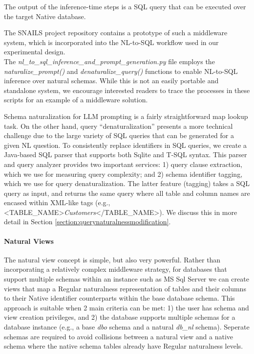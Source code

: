 The output of the inference-time steps is a SQL query that can be executed over the target Native database.

The SNAILS project repository contains a prototype of such a middleware system, which is incorporated into the NL-to-SQL workflow used in our experimental design.
\\The \emph{nl\_to\_sql\_inference\_and\_prompt\_generation.py} file employs the \emph{naturalize\_prompt()} and \emph{denaturalize\_query()} functions to enable NL-to-SQL inference over natural schemas.
While this is not an easily portable and standalone system, we encourage interested readers to trace the processes in these scripts for an example of a middleware solution.

Schema naturalization for LLM prompting is a fairly straightforward map lookup task. 
On the other hand, query ``denaturalization'' presents a more technical challenge due to the large variety of SQL queries that can be generated for a given NL question.
To consistently replace identifiers in SQL queries, we create a Java-based SQL parser that supports both Sqlite and T-SQL syntax.
This parser and query analyzer provides two important services: 1) query clause extraction, which we use for measuring query complexity; and 2) schema identifier tagging, which we use for query denaturalization.
The latter feature (tagging) takes a SQL query as input, and returns the same query where all table and column names are encased within XML-like tags (e.g., <TABLE\_NAME>\emph{Customers}</TABLE\_NAME>).
We discuss this in more detail in Section \ref{section:querynaturalnessmodification}.

\paragraph{\textbf{Natural Views}}

The natural view concept is simple, but also very powerful.
Rather than incorporating a relatively complex middleware strategy, for databases that support multiple schemas within an instance such as MS Sql Server we can create views that map a Regular naturalness representation of tables and their columns to their Native identifier counterparts within the base database schema.
This approach is suitable when 2 main criteria can be met: 1) the user has schema and view creation privileges, and 2) the database supports multiple schemas for a database instance (e.g., a base \emph{dbo} schema and a natural \emph{db\_nl} schema).
Seperate schemas are required to avoid collisions between a natural view and a native schema where the native schema tables already have Regular naturalness levels.

